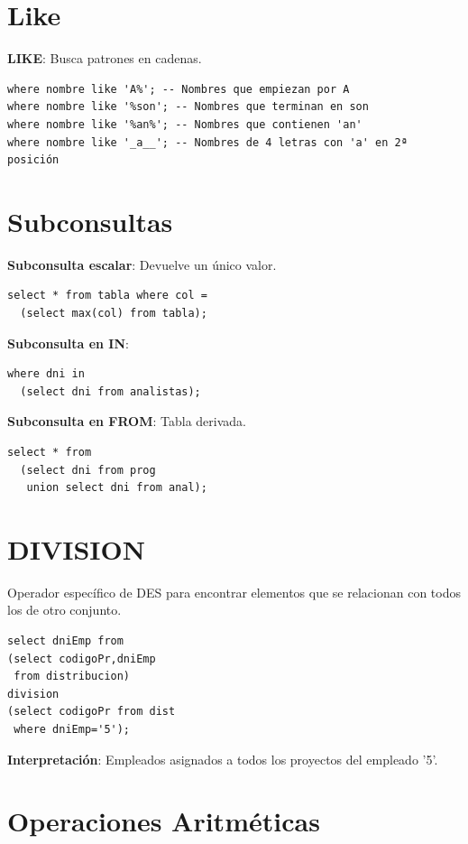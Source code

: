\documentclass[8pt,a4paper,twocolumn]{article}
\begin{document}
\section{Like}
\textbf{LIKE}: Busca patrones en cadenas.
\begin{lstlisting}
where nombre like 'A%'; -- Nombres que empiezan por A
where nombre like '%son'; -- Nombres que terminan en son
where nombre like '%an%'; -- Nombres que contienen 'an'
where nombre like '_a__'; -- Nombres de 4 letras con 'a' en 2ª posición
\end{lstlisting}

\section{Subconsultas}

\textbf{Subconsulta escalar}: Devuelve un único valor.
\begin{lstlisting}
select * from tabla where col =
  (select max(col) from tabla);
\end{lstlisting}

\textbf{Subconsulta en IN}:
\begin{lstlisting}
where dni in 
  (select dni from analistas);
\end{lstlisting}

\textbf{Subconsulta en FROM}: Tabla derivada.
\begin{lstlisting}
select * from 
  (select dni from prog 
   union select dni from anal);
\end{lstlisting}

\section{DIVISION}

Operador específico de DES para encontrar elementos que se relacionan con todos los de otro conjunto.

\begin{lstlisting}
select dniEmp from
(select codigoPr,dniEmp 
 from distribucion)
division
(select codigoPr from dist
 where dniEmp='5');
\end{lstlisting}

\textbf{Interpretación}: Empleados asignados a todos los proyectos del empleado '5'.

\section{Operaciones Aritméticas}
\end{document}
